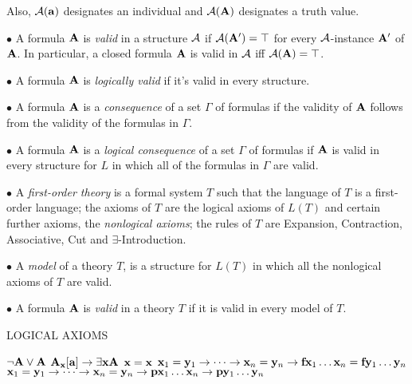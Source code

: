 Also, ${\cal A}({\bf a})$ designates an individual and ${\cal A}({\bf A})$ designates a truth value.
\smallskip

\item{$\bullet$} A formula ${\bf A}$ is {\it valid} in a structure ${\cal A}$ if ${\cal A}({\bf A}') = \top$ for 
every ${\cal A}$-instance ${\bf A}'$ of ${\bf A}$. In particular, a closed formula ${\bf A}$ is valid in
${\cal A}$ iff ${\cal A}({\bf A}) = \top$.
\smallskip

\item{$\bullet$} A formula ${\bf A}$ is {\it logically valid} if it's valid in every structure.
\smallskip

\item{$\bullet$} A formula ${\bf A}$ is a {\it consequence} of a set $\Gamma$ of formulas if the 
validity of ${\bf A}$ follows from the validity of the formulas in $\Gamma$.
\smallskip

\item{$\bullet$} A formula ${\bf A}$ is a {\it logical consequence} of a set $\Gamma$ of formulas 
if ${\bf A}$ is valid in every structure for $L$ in which all of the formulas in $\Gamma$ are valid.
\smallskip

\item{$\bullet$} A {\it first-order theory} is a formal system $T$ such that
 the language of $T$ is a first-order language;
 the axioms of $T$ are the logical axioms of $L(T)$ and certain further axioms, the {\it nonlogical axioms};
 the rules of $T$ are Expansion, Contraction, Associative, Cut and $\exists$-Introduction.
\smallskip

\item{$\bullet$} A {\it model} of a theory $T$, is a structure for $L(T)$ in which all the nonlogical axioms of $T$ are valid.

\item{$\bullet$} A formula ${\bf A}$ is {\it valid} in a theory $T$ if it is valid in every model of $T$.

\beginsection LOGICAL AXIOMS

{\leftskip 1in
 $\neg {\bf A} \lor {\bf A}$
 ${\bf A}_{\bf x}[{\bf a}] \to \exists {\bf x}{\bf A}$
 ${\bf x} = {\bf x}$
 ${\bf x}_1 = {\bf y}_1 \to \cdots \to {\bf x}_n = {\bf y}_n \to {\bf f}{\bf x}_1 \dots {\bf x}_n = {\bf f}{\bf y}_1 \dots {\bf y}_n$
\itemitem{} ${\bf x}_1 = {\bf y}_1 \to \cdots \to {\bf x}_n = {\bf y}_n \to {\bf p}{\bf x}_1 \dots {\bf x}_n \to {\bf p}{\bf y}_1 \dots {\bf y}_n$
\par}

